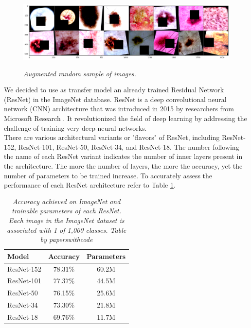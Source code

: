 \begin{figure}[H]
  \centering
  \begin{adjustbox}{width=0.9\textwidth}
  \includegraphics[width=\textwidth]{imatges/methodological_contribution/random-sample-of-isic-augmented.png}
  \end{adjustbox}
  \caption[Augmented random sample of images]{\textit{Augmented random sample of images.}}
  {\label{fig:aug-sample-of-datasets}}
\end{figure}


We decided to use as transfer model an already trained Residual Network
(ResNet) in the ImageNet database. ResNet is a deep convolutional neural
network (CNN) architecture that was introduced in 2015 by researchers from
Microsoft Research \cite{ResNetPaper}. It revolutionized the field of deep
learning by addressing the challenge of training very deep neural networks. \\

There are various architectural variants or "flavors" of ResNet, including
ResNet-152,  ResNet-101,  ResNet-50,  ResNet-34, and  ResNet-18. The number
following the name of each ResNet variant indicates the number of inner layers
present in the architecture. The more the number of layers, the more the
accuracy, yet the number of parameters to be trained increase. To accurately
assess the performance of each ResNet architecture refer to Table
\ref{table:resnet}.

\begin{table}[H]
  \centering
  \begin{tabular}{lcc}
    \toprule
    \textbf{Model} & \textbf{Accuracy} & \textbf{Parameters} \\
    \midrule
    ResNet-152 & 78.31\% & 60.2M \\
    ResNet-101 & 77.37\% & 44.5M \\
    ResNet-50 & 76.15\% & 25.6M \\
    ResNet-34 & 73.30\% & 21.8M \\
    ResNet-18 & 69.76\% & 11.7M \\
    \bottomrule
  \end{tabular}
  \caption[Accuracy achieved on ImageNet and trainable parameters of each ResNet]
  {\textit{Accuracy achieved on ImageNet and trainable parameters of each ResNet.
  Each image in the ImageNet dataset is associated with 1 of 1,000 classes. Table by paperswithcode}}
  {\label{table:resnet}}
\end{table}

